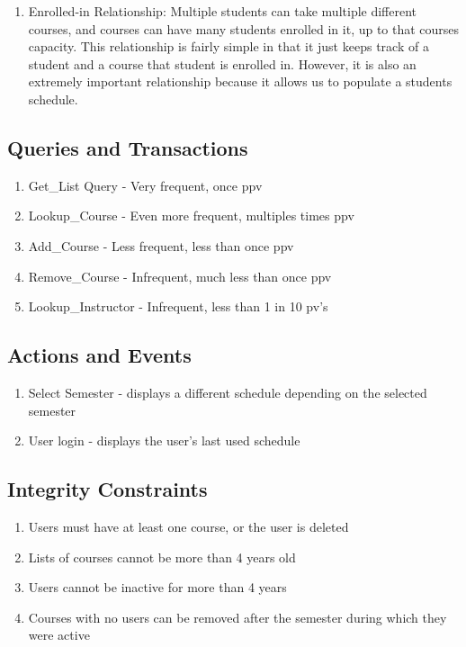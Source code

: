 \documentclass[pdftex,12pt,letter]{article}
\begin{document}
\begin{enumerate}[1.]
\item Enrolled-in Relationship: Multiple students can take multiple different courses, and courses can have many students enrolled in it, up to that courses capacity. This relationship is fairly simple in that it just keeps track of a student and a course that student is enrolled in. However, it is also an extremely important relationship because it allows us to populate a students schedule.
\end{enumerate}
\subsection*{Queries and Transactions}
\begin{enumerate}[1.]
\item Get\_List Query - Very frequent, once ppv
\item Lookup\_Course - Even more frequent, multiples times ppv
\item Add\_Course - Less frequent, less than once ppv
\item Remove\_Course - Infrequent, much less than once ppv
\item Lookup\_Instructor - Infrequent, less than 1 in 10 pv's
\end{enumerate}
\subsection*{Actions and Events}
\begin{enumerate}[1.]
\item Select Semester - displays a different schedule depending on the selected semester
\item User login - displays the user's last used schedule
\end{enumerate}
\subsection*{Integrity Constraints}
\begin{enumerate}
\item Users must have at least one course, or the user is deleted
\item Lists of courses cannot be more than 4 years old
\item Users cannot be inactive for more than 4 years
\item Courses with no users can be removed after the semester during which they were active
\end{enumerate}
\end{document}
